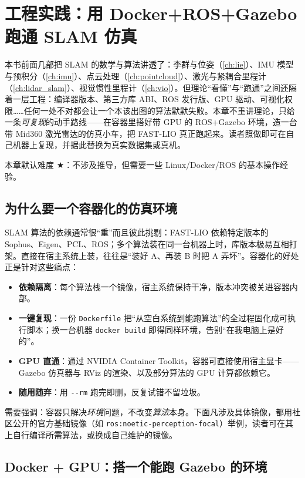 \chapter{工程实践：用 Docker+ROS+Gazebo 跑通 SLAM 仿真}
\label{ch:engineering}

本书前面几部把 SLAM 的数学与算法讲透了：李群与位姿（\cref{ch:lie}）、IMU 模型与预积分（\cref{ch:imu}）、点云处理（\cref{ch:pointcloud}）、激光与紧耦合里程计（\cref{ch:lidar_slam}）、视觉惯性里程计（\cref{ch:vio}）。但理论“看懂”与“跑通”之间还隔着一层工程：编译器版本、第三方库 ABI、ROS 发行版、GPU 驱动、可视化权限……任何一处不对都会让一个本该出图的算法默默失败。本章不重讲理论，只给一条\emph{可复现}的动手路线——在容器里搭好带 GPU 的 ROS+Gazebo 环境，造一台带 Mid360 激光雷达的仿真小车，把 FAST-LIO 真正跑起来。读者照做即可在自己机器上复现，并据此替换为真实数据集或真机。

本章默认难度 $\bigstar$：不涉及推导，但需要一些 Linux/Docker/ROS 的基本操作经验。

\section{为什么要一个容器化的仿真环境}

SLAM 算法的依赖通常很“重”而且彼此挑剔：FAST-LIO 依赖特定版本的 Sophus、Eigen、PCL、ROS；多个算法装在同一台机器上时，库版本极易互相打架。直接在宿主系统上装，往往是“装好 A、再装 B 时把 A 弄坏”。容器化的好处正是针对这些痛点：

\begin{itemize}
  \item \textbf{依赖隔离}：每个算法栈一个镜像，宿主系统保持干净，版本冲突被关进容器内部。
  \item \textbf{一键复现}：一份 \verb|Dockerfile| 把“从空白系统到能跑算法”的全过程固化成可执行脚本；换一台机器 \verb|docker build| 即得同样环境，告别“在我电脑上是好的”。
  \item \textbf{GPU 直通}：通过 NVIDIA Container Toolkit，容器可直接使用宿主显卡——Gazebo 仿真器与 RViz 的渲染、以及部分算法的 GPU 计算都依赖它。
  \item \textbf{随用随弃}：用 \verb|--rm| 跑完即删，反复试错不留垃圾。
\end{itemize}

需要强调：容器只解决\emph{环境}问题，不改变\emph{算法}本身。下面凡涉及具体镜像，都用社区公开的官方基础镜像（如 \verb|ros:noetic-perception-focal|）举例，读者可在其上自行编译所需算法，或换成自己维护的镜像。

\section{Docker + GPU：搭一个能跑 Gazebo 的环境}

